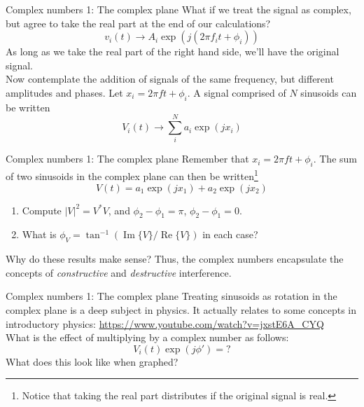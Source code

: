 \documentclass{beamer}
\begin{document}
\begin{frame}{Complex numbers 1: The complex plane}
What if we treat the signal as complex, but agree to take the real part at the end of our calculations?
\begin{equation}
v_i(t) \rightarrow A_i \exp(j(2\pi f_i t + \phi_i))
\end{equation}
As long as we take the real part of the right hand side, we'll have the original signal. \\ \vspace{0.5cm}
Now contemplate the addition of signals of the same frequency, but different amplitudes and phases.  Let $x_i = 2\pi ft+\phi_i$.  A signal comprised of $N$ sinusoids can be written
\begin{equation}
V_i(t) \rightarrow \sum_i^N a_i \exp(jx_i)
\end{equation}
\end{frame}

\begin{frame}{Complex numbers 1: The complex plane}
Remember that $x_i = 2\pi ft+\phi_i$.  The sum of two sinusoids in the complex plane can then be written\footnote{Notice that taking the real part distributes if the original signal is real.}
\begin{equation}
V(t) = a_1\exp(j x_1) + a_2\exp(j x_2)
\end{equation}
\begin{enumerate}
\item Compute $|V|^2 = V^*V$, and $\phi_2 - \phi_1 = \pi$, $\phi_2 - \phi_1 = 0$.
\item What is $\phi_V = \tan^{-1}(\operatorname{Im}\lbrace V \rbrace/\operatorname{Re}\lbrace V \rbrace)$ in each case?
\end{enumerate}
Why do these results make sense?  Thus, the complex numbers encapsulate the concepts of \textit{constructive} and \textit{destructive} interference.
\end{frame}

\begin{frame}{Complex numbers 1: The complex plane}
Treating sinusoids as rotation in the complex plane is a deep subject in physics.  It actually relates to some concepts in introductory physics: \url{https://www.youtube.com/watch?v=jxstE6A_CYQ} \\ \vspace{0.5cm}
What is the effect of multiplying by a complex number as follows:
\begin{equation}
V_i(t) \exp(j\phi') = ?
\end{equation}
What does this look like when graphed?
\end{frame}
\end{document}
